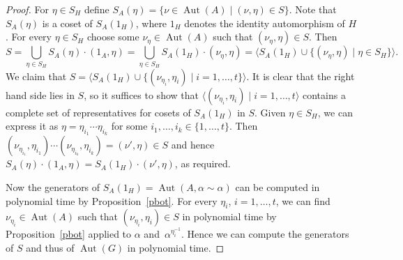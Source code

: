 \documentclass[10pt,a4paper]{amsart}
\DeclareMathOperator{\Aut}{Aut}
\begin{document}
\begin{proof}
	For \( \eta \in S_H \) define \( S_A(\eta) = \{ \nu \in \Aut(A) \mid (\nu, \eta) \in S \} \).
	Note that \( S_A(\eta) \) is a coset of \( S_A(1_H) \), where \( 1_H \) denotes the identity automorphism of \( H \).
	For every \( \eta \in S_H \) choose some \( \nu_\eta \in \Aut(A) \) such that \( (\nu_\eta, \eta) \in S \). Then
	\[ S = \bigcup_{\eta \in S_H} S_A(\eta) \cdot (1_A, \eta) = \bigcup_{\eta \in S_H} S_A(1_H) \cdot (\nu_\eta, \eta) =
	\langle S_A(1_H) \cup \{ (\nu_\eta, \eta) \mid \eta \in S_H \} \rangle. \]
	We claim that \( S = \langle S_A(1_H) \cup \{ (\nu_{\eta_i}, \eta_i) \mid i = 1, \dots, t \} \rangle \).
	It is clear that the right hand side lies in \( S \), so it suffices to show that \( \langle (\nu_{\eta_i}, \eta_i) \mid i = 1, \dots, t \rangle \)
	contains a complete set of representatives for cosets of \( S_A(1_H) \) in \( S \).
	Given \( \eta \in S_H \), we can express it as \( \eta = \eta_{i_1} \cdots \eta_{i_k} \) for some \( i_1, \dots, i_k \in \{ 1, \dots, t \} \).
	Then \( (\nu_{\eta_{i_1}}, \eta_{i_1}) \cdots (\nu_{\eta_{i_k}}, \eta_{i_k}) = (\nu', \eta) \in S \) and hence
	\( S_A(\eta) \cdot (1_A, \eta) = S_A(1_H) \cdot (\nu', \eta) \), as required.

	Now the generators of \( S_A(1_H) = \Aut(A, \alpha \sim \alpha) \) can be computed in polynomial time by Proposition~\ref{pbot}.
	For every \( \eta_i \), \( i = 1, \dots, t \), we can find \( \nu_{\eta_i} \in \Aut(A) \) such that \( (\nu_{\eta_i}, \eta_i) \in S \)
	in polynomial time by Proposition~\ref{pbot} applied to \( \alpha \) and~\( \alpha^{\eta_i^{-1}} \).
	Hence we can compute the generators of \( S \) and thus of \( \Aut(G) \) in polynomial time.
\end{proof}
\end{document}
